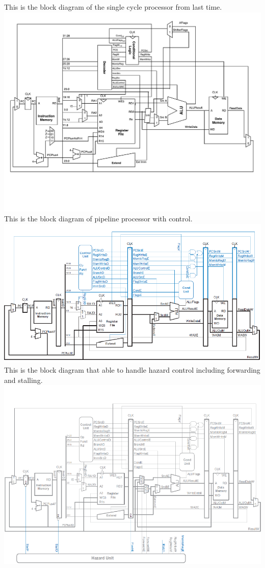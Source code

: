 \documentclass{article}
\begin{document}
This is the block diagram of the single cycle processor from last time.
\newline
\includegraphics[width=1.0\textwidth]{SingleCycleProcessor.pdf}
\newline
This is the block diagram of pipeline processor with control.
\newline
\includegraphics[width=1.0\textwidth]{Blockdiagramwithpp.png}
\newline
This is the block diagram that able to handle hazard control including forwarding and stalling.
\newline
\includegraphics[width=1.0\textwidth]{Blockdiagramwithhu.png}
\end{document}
